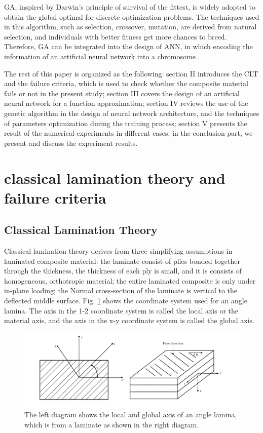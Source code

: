 \documentclass[letterpaper]{IEEEtran}
\begin{document}
GA, inspired by Darwin’s principle of survival of the fittest, is widely adopted
to obtain the global optimal for discrete optimization problems. The techniques
used in this algorithm, such as selection, crossover, mutation, are derived from
natural selection, and individuals with better fitness get more chances to
breed. Therefore, GA can be integrated into the design of ANN, in which encoding
the information of an artificial neural network into a chromosome
\cite{liu1996evolutionary,rodzin2016neuroevolution}.

The rest of this paper is organized as the following: section II introduces the
CLT and the failure criteria, which is used to check whether the composite
material fails or not in the present study; section III covers the design of an
artificial neural network for a function approximation; section IV reviews the
use of the genetic algorithm in the design of neural network architecture, and
the techniques of parameters optimization during the training process; section V
presents the result of the numerical experiments in different cases; in the
conclusion part, we present and discuss the experiment results.

\section{classical lamination theory and failure criteria}

\subsection{Classical Lamination Theory}

Classical lamination theory derives from three simplifying assumptions in
laminated composite material: the laminate consist of plies bonded together
through the thickness, the thickness of each ply is small, and it is consists of
homogeneous, orthotropic material; the entire laminated composite is only under
in-plane loading; the Normal cross-section of the laminate is vertical to the
deflected middle surface. Fig. \ref{fig:lamina_local_and_global} shows the
coordinate system used for an angle lamina. The axis in the 1-2 coordinate
system is called the local axis or the material axis, and the axis in the x-y
coordinate system is called the global axis.

\begin{figure}[b]
	\includegraphics[width=1\linewidth]{lamina_local_global_axes.png}
	\caption{The left diagram shows the local and global axis of an angle lamina, which is from a laminate as shown in the right diagram.}
	\label{fig:lamina_local_and_global}
\end{figure}
\end{document}
